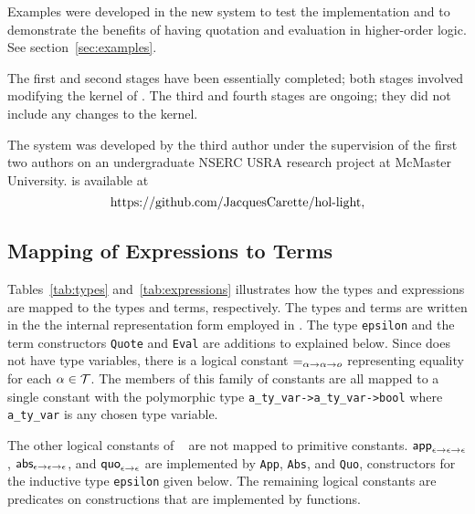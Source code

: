 \documentclass[fleqn]{llncs}
\begin{document}
  \item Examples were developed in the new system to test the
    implementation and to demonstrate the benefits of having quotation
    and evaluation in higher-order logic.  See section~\ref{sec:examples}.

\ee

\noindent
The first and second stages have been essentially completed; both
stages involved modifying the kernel of {\HL}.  The third and fourth
stages are ongoing; they did not include any changes to the {\HL}
kernel.

The {\HLQE} system was developed by the third author under the
supervision of the first two authors on an undergraduate NSERC USRA
research project at McMaster University.  {\HLQE} is available at
\[\mbox{https://github.com/JacquesCarette/hol-light},\]

\subsection{Mapping of {\churchqe} Expressions to {\HOL} Terms}\label{subsec:mapping}

Tables~\ref{tab:types} and~\ref{tab:expressions} illustrates how the
{\churchqe} types and expressions are mapped to the {\HOL} types and
terms, respectively.  The {\HOL} types and terms are written in the
the internal representation form employed in {\HLQE}.  The type
\texttt{epsilon} and the term constructors \texttt{Quote} and
\texttt{Eval} are additions to {\HL} explained below.  Since
{\churchqe} does not have type variables, there is a logical constant
$\mbox{\sf =}_{\alpha \rightarrow \alpha \rightarrow o}$ representing equality
for each $\alpha \in \mbox{$\cal T$}$.  The members of this family of constants
are all mapped to a single {\HOL} constant with the polymorphic type
\texttt{a\_ty\_var->a\_ty\_var->bool} where \texttt{a\_ty\_var} is any
chosen {\HOL} type variable.  

The other logical constants of {\churchqe}~\cite[Table 1]{FarmerArxiv16}
are not mapped to primitive {\HOL} constants.  $\mbox{\sf app}_{\epsilon
  \rightarrow \epsilon \rightarrow \epsilon}$, $\mbox{\sf abs}_{\epsilon \rightarrow
  \epsilon \rightarrow \epsilon}$, and $\mbox{\sf quo}_{\epsilon \rightarrow
  \epsilon}$ are implemented by \texttt{App}, \texttt{Abs}, and
\texttt{Quo}, constructors for the inductive type \texttt{epsilon}
given below.  The remaining logical constants are predicates on
constructions that are implemented by {\HOL} functions.
\end{document}
